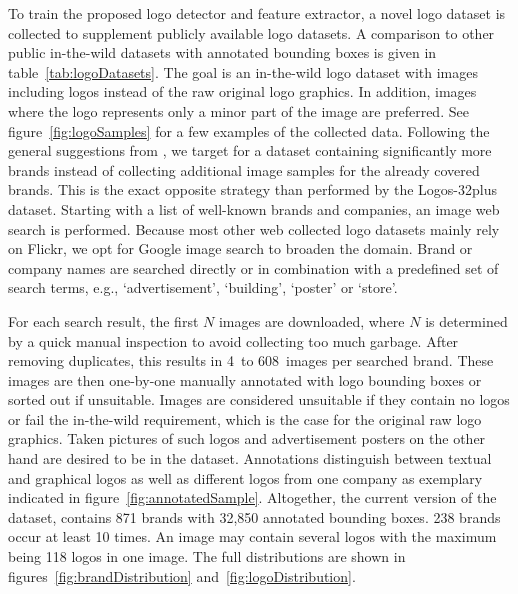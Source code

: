\documentclass[a4paper,twoside]{article}
\newcommand{\xeg}{e.g.}
\begin{document}
%
\noindent To train the proposed logo detector and feature extractor, a novel logo dataset is collected to supplement publicly available logo datasets. A comparison to other public in-the-wild datasets with annotated bounding boxes is given in table~\ref{tab:logoDatasets}.
The goal is an in-the-wild logo dataset with images including logos instead of the raw original logo graphics. In addition, images where the logo represents only a minor part of the image are preferred. See figure~\ref{fig:logoSamples} for a few examples of the collected data.
Following the general suggestions from \cite{bansal2017}, we target for a dataset containing significantly more brands instead of collecting additional image samples for the already covered brands. This is the exact opposite strategy than performed by the Logos-32plus dataset.
Starting with a list of well-known brands and companies, an image web search is performed. Because most other web collected logo datasets mainly rely on Flickr, we opt for Google image search to broaden the domain. Brand or company names are searched directly or in combination with a predefined set of search terms, \xeg, `advertisement', `building', `poster' or `store'. 

For each search result, the first $N$ images are downloaded, where $N$ is determined by a quick manual inspection to avoid collecting too much garbage. 
After removing duplicates, this results in 4~to 608~images per searched brand. These images are then one-by-one manually annotated with logo bounding boxes or sorted out if unsuitable.
Images are considered unsuitable if they contain no logos or fail the in-the-wild requirement, which is the case for the original raw logo graphics. Taken pictures of such logos and advertisement posters on the other hand are desired to be in the dataset. 
Annotations distinguish between textual and graphical logos as well as different logos from one company as exemplary indicated in figure~\ref{fig:annotatedSample}.
Altogether, the current version of the dataset, contains 871 brands with 32,850 annotated bounding boxes. 238 brands occur at least 10 times. An image may contain several logos with the maximum being 118 logos in one image. The full distributions are shown in figures~\ref{fig:brandDistribution} and~\ref{fig:logoDistribution}. 
\end{document}
